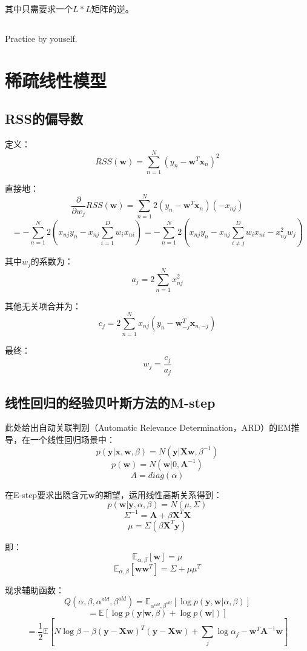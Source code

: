 \documentclass[UTF8]{ctexart}
\begin{document}
其中只需要求一个$L*L$矩阵的逆。

\subsection{}
Practice by youself.


\newpage
\section{稀疏线性模型}
\subsection{RSS的偏导数}
定义：
$$RSS(\textbf{w})=\sum_{n=1}^{N}(y_{n}-\textbf{w}^{T}\textbf{x}_{n})^{2}$$

直接地：
$$\frac{\partial}{\partial w_{j}}RSS(\textbf{w})=\sum_{n=1}^{N}2(y_{n}-\textbf{w}^{T}\textbf{x}_{n})(-x_{nj})$$
$$=-\sum_{n=1}^{N}2(x_{nj}y_{n}-x_{nj}\sum_{i=1}^{D}w_{i}x_{ni})=-\sum_{n=1}^{N}2(x_{nj}y_{n}-x_{nj}\sum_{i\neq j}^{D}w_{i}x_{ni}-x_{nj}^{2}w_{j})$$

其中$w_{j}$的系数为：
$$a_{j}=2\sum_{n=1}^{N}x_{nj}^{2}$$

其他无关项合并为：
$$c_{j}=2\sum_{n=1}^{N}x_{nj}(y_{n}-\textbf{w}_{-j}^{T}\textbf{x}_{n,-j})$$

最终：
$$w_{j}=\frac{c_{j}}{a_{j}}$$

\subsection{线性回归的经验贝叶斯方法的M-step}
此处给出自动关联判别（Automatic Relevance Determination，ARD）的EM推导，在一个线性回归场景中：
$$p(\textbf{y}|\textbf{x},\textbf{w},\beta)=N(\textbf{y}|\textbf{X}\textbf{w},\beta^{-1})$$
$$p(\textbf{w})=N(\textbf{w}|0,\textbf{A}^{-1})$$
$$A=diag(\alpha)$$

在E-step要求出隐含元$\textbf{w}$的期望，运用线性高斯关系得到：
$$p(\textbf{w}|\textbf{y},\alpha,\beta)=N(\mu,\Sigma)$$
$$\Sigma^{-1}=\textbf{A}+\beta \textbf{X}^{T}\textbf{X}$$
$$\mu=\Sigma(\beta \textbf{X}^{T}\textbf{y})$$

即：
$$\mathbb{E}_{\alpha,\beta}[\textbf{w}]=\mu$$
$$\mathbb{E}_{\alpha,\beta}[\textbf{w}\textbf{w}^{T}]=\Sigma+\mu\mu^{T}$$

现求辅助函数：
$$Q(\alpha,\beta,\alpha^{old},\beta^{old})=\mathbb{E}_{\alpha^{old},\beta^{old}}[\log p(\textbf{y},\textbf{w}|\alpha,\beta)]$$
$$=\mathbb{E}[\log p(\textbf{y}|\textbf{w},\beta) + \log p(\textbf{w}|)]$$
$$=\frac{1}{2}\mathbb{E}[N \log \beta -\beta (\textbf{y}-\textbf{X}\textbf{w})^{T}(\textbf{y}-\textbf{X}\textbf{w})+\sum_{j}\log \alpha_{j} - \textbf{w}^{T}\textbf{A}^{-1}\textbf{w}]$$
\end{document}
